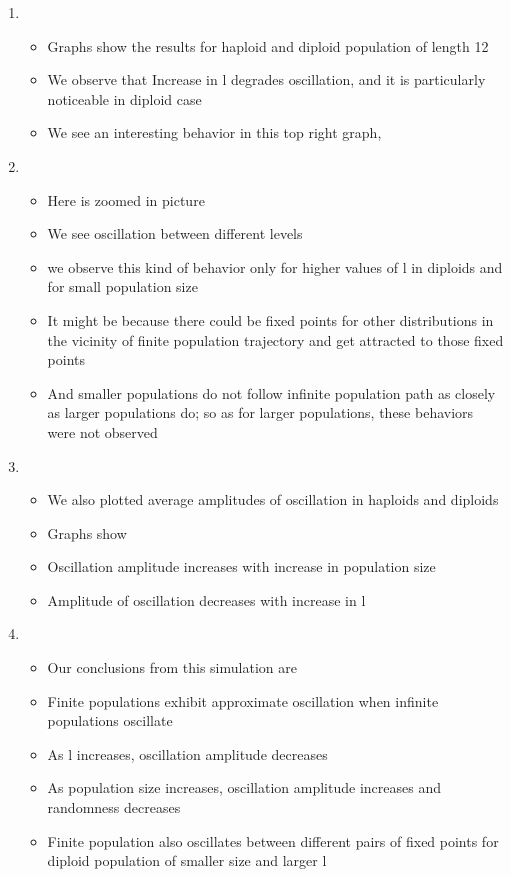 \documentclass{article}
\begin{document}
\begin{enumerate}
\item
  \begin{itemize}
  \item Graphs show the results for haploid and diploid population of
    length 12
   \item We observe that Increase in l degrades oscillation, and it is
     particularly noticeable in diploid case
  \item We see an interesting behavior in this top right graph,
  \end{itemize}
    
\item
  \begin{itemize}
  \item Here is zoomed in picture
   \item We see oscillation between different levels
  \item we observe this kind of behavior only for higher values of l
    in diploids and for small population size
  \item It might be because there could be fixed points for other
    distributions in the vicinity of finite population trajectory and
    get attracted to those fixed points
  \item And smaller populations do not follow infinite population path
    as closely as larger populations do; so as for larger populations,
    these behaviors were not observed
  \end{itemize}
    
\item
  \begin{itemize}
  \item We also plotted average amplitudes of oscillation in haploids
    and diploids
   \item Graphs show
   \item Oscillation amplitude increases with increase in population
     size
   \item Amplitude of oscillation decreases with increase in l
  \end{itemize}
    
\item
  \begin{itemize}
  \item Our conclusions from this simulation are
   \item Finite populations exhibit approximate oscillation when
     infinite populations oscillate
  \item As l increases, oscillation amplitude decreases
  \item As population size increases, oscillation amplitude increases
    and randomness decreases
  \item Finite population also oscillates between different pairs of
    fixed points for diploid population of smaller size and larger l
  \end{itemize}
  

\end{enumerate}
\end{document}
